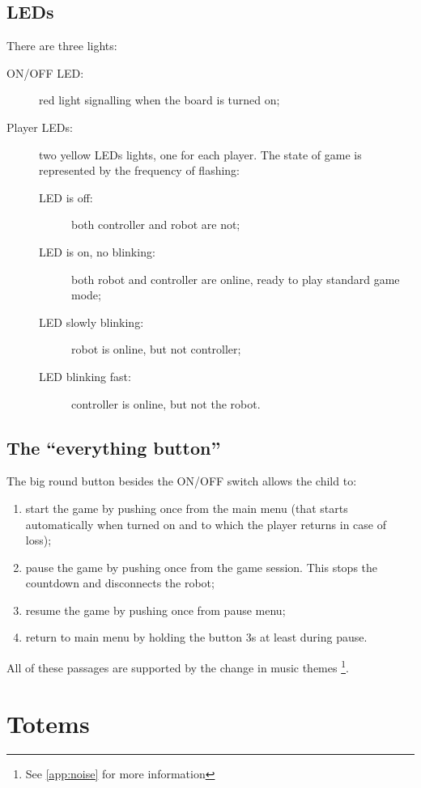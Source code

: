 \documentclass[a4paper,twoside]{book}
\begin{document}
\subsection{LEDs}

\beforelist There are three lights:
\begin{description}
\item[ON/OFF LED:] red light signalling when the board is turned on;
\item[Player LEDs:] two yellow LEDs lights, one for each player. The state of game is represented by the frequency of flashing:
  \begin{description}
  \item[LED is off:] both controller and robot are not;
  \item[LED is on, no blinking:] both robot and controller are online, ready to play standard game mode;
  \item[LED slowly blinking:] robot is online, but not controller;
  \item[LED blinking fast:] controller is online, but not the robot.
  \end{description}
\end{description}
\afterlist*

\subsection{The \textquotedblleft{}everything button\textquotedblright{}}

\beforelist The big round button besides the ON/OFF switch allows the child to:
\begin{enumerate}
\item start the game by pushing once from the main menu (that starts automatically when turned on and to which the player returns in case of loss);
\item pause the game by pushing once from the game session. This stops the countdown and disconnects the robot;
\item resume the game by pushing once from pause menu;
\item return to main menu by holding the button 3s at least during pause.
\end{enumerate}
\afterlist
All of these passages are supported by the change in music themes%
\footnote {See \autoref{app:noise} for more information}.


\section{Totems}
\label{sec:totem}
\end{document}
